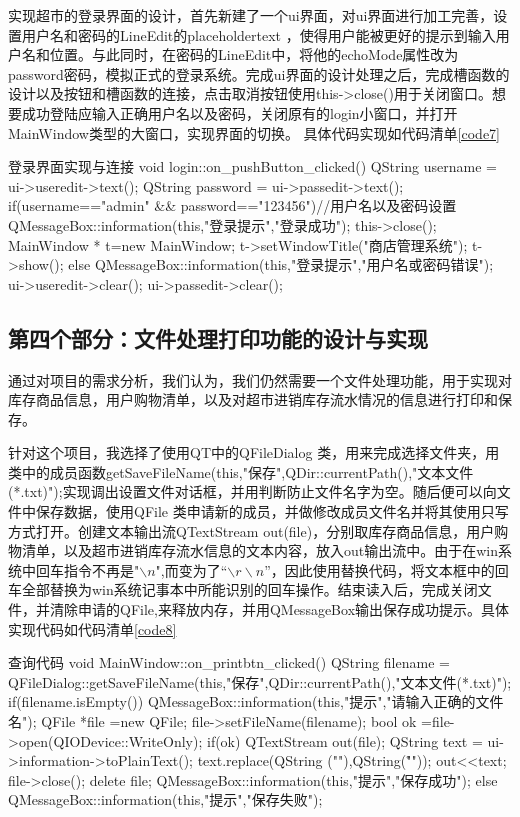 \documentclass[
   projtype=report, %
   output=print,     %
  ]{nwafuprojrep}
\begin{document}
实现超市的登录界面的设计，首先新建了一个ui界面，对ui界面进行加工完善，设置用户名和密码的LineEdit的placeholdertext ，使得用户能被更好的提示到输入用户名和位置。与此同时，在密码的LineEdit中，将他的echoMode属性改为password密码，模拟正式的登录系统。完成ui界面的设计处理之后，完成槽函数的设计以及按钮和槽函数的连接，点击取消按钮使用this->close()用于关闭窗口。想要成功登陆应输入正确用户名以及密码，关闭原有的login小窗口，并打开MainWindow类型的大窗口，实现界面的切换。 具体代码实现如代码清单\ref{code7}
\begin{langCVOne}[C++][code7][QT]{登录界面实现与连接}
void login::on_pushButton_clicked()
{
    QString username = ui->useredit->text();
    QString password = ui->passedit->text();
    if(username=="admin" && password=="123456")//用户名以及密码设置
    {
        QMessageBox::information(this,"登录提示","登录成功");
        this->close();
        MainWindow * t=new MainWindow;
        t->setWindowTitle("商店管理系统");
        t->show();
    }
    else
    {
        QMessageBox::information(this,"登录提示","用户名或密码错误");
        ui->useredit->clear();
        ui->passedit->clear();
    }
}
\end{langCVOne}
\subsection{第四个部分：文件处理打印功能的设计与实现}
通过对项目的需求分析，我们认为，我们仍然需要一个文件处理功能，用于实现对库存商品信息，用户购物清单，以及对超市进销库存流水情况的信息进行打印和保存。

针对这个项目，我选择了使用QT中的QFileDialog 类，用来完成选择文件夹，用类中的成员函数getSaveFileName(this,"保存",QDir::currentPath(),"文本文件(*.txt)");实现调出设置文件对话框，并用判断防止文件名字为空。随后便可以向文件中保存数据，使用QFile 类申请新的成员，并做修改成员文件名并将其使用只写方式打开。创建文本输出流QTextStream out(file)，分别取库存商品信息，用户购物清单，以及超市进销库存流水信息的文本内容，放入out输出流中。由于在win系统中回车指令不再是"$\backslash n$",而变为了“$\backslash r \backslash n$”，因此使用替换代码，将文本框中的回车全部替换为win系统记事本中所能识别的回车操作。结束读入后，完成关闭文件，并清除申请的QFile,来释放内存，并用QMessageBox输出保存成功提示。具体实现代码如代码清单\ref{code8}
\begin{langCVOne}[C++][code8][QT]{查询代码}
void MainWindow::on_printbtn_clicked()
{
    QString filename = QFileDialog::getSaveFileName(this,"保存",QDir::currentPath(),"文本文件(*.txt)");
    if(filename.isEmpty())
    {
        QMessageBox::information(this,"提示","请输入正确的文件名");
    }
    QFile *file =new QFile;
    file->setFileName(filename);
    bool ok =file->open(QIODevice::WriteOnly);
    if(ok)
    {
        QTextStream out(file);
        QString text = ui->information->toPlainText();
        text.replace(QString ("\n"),QString("\r\n"));
        out<<text;
        file->close();
        delete file;
        QMessageBox::information(this,"提示","保存成功");
    }
    else
    {
        QMessageBox::information(this,"提示","保存失败");
    }
}
\end{langCVOne}
\end{document}
